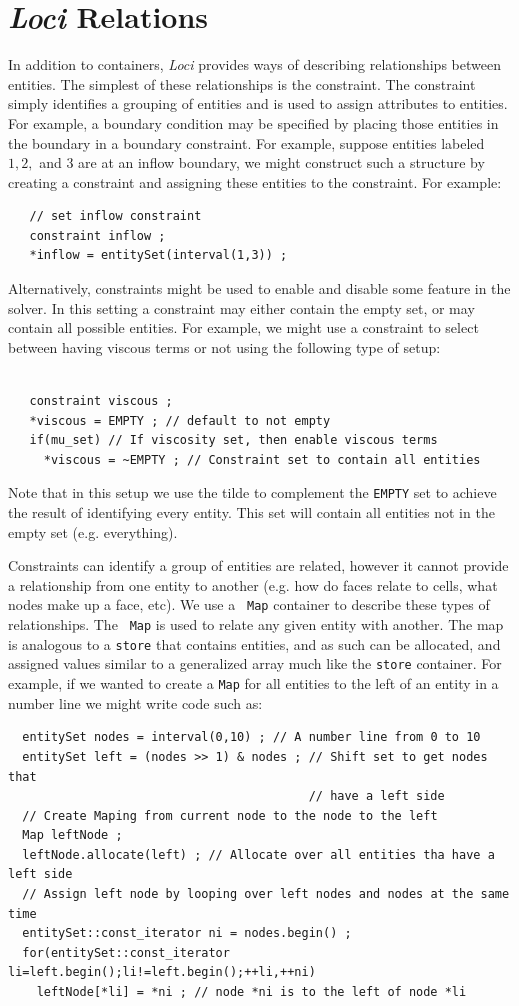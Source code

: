 \documentclass[10pt,epsf,letterpaper,twoside]{book}
\begin{document}
\section{{\it Loci} Relations}

In addition to containers, {\it Loci} provides ways of describing
relationships between entities.  The simplest of these relationships
is the constraint.  The constraint simply identifies a grouping of
entities and is used to assign attributes to entities.  For example, a
boundary condition may be specified by placing those entities in the
boundary in a boundary constraint.  For example, suppose entities
labeled $1,2,$ and $3$ are at an inflow boundary, we might construct
such a structure by creating a constraint and assigning these entities
to the constraint.  For example:
\begin{verbatim}
   // set inflow constraint
   constraint inflow ;
   *inflow = entitySet(interval(1,3)) ;
\end{verbatim}
Alternatively, constraints might be used to enable and disable some
feature in the solver.  In this setting a constraint may either
contain the empty set, or may contain all possible entities.  For
example, we might use a constraint to select between having viscous
terms or not using the following type of setup:
\begin{verbatim}

   constraint viscous ;
   *viscous = EMPTY ; // default to not empty 
   if(mu_set) // If viscosity set, then enable viscous terms
     *viscous = ~EMPTY ; // Constraint set to contain all entities
\end{verbatim}
Note that in this setup we use the tilde to complement the {\tt EMPTY} set
to achieve the result of identifying every entity.  This set will contain
all entities not in the empty set (e.g. everything).  

Constraints can identify a group of entities are related, however it
cannot provide a relationship from one entity to another (e.g. how do
faces relate to cells, what nodes make up a face, etc).  We use a {\tt
  Map} container to describe these types of relationships.  The {\tt
  Map} is used to relate any given entity with another.  The map is
analogous to a {\tt store} that contains entities, and as such can be
allocated, and assigned values similar to a generalized array much
like the {\tt store} container.  For example, if we wanted to create a {\tt Map} for all entities to the left of an entity in a number line we might write code such as:
\begin{verbatim}
  entitySet nodes = interval(0,10) ; // A number line from 0 to 10
  entitySet left = (nodes >> 1) & nodes ; // Shift set to get nodes that
                                          // have a left side
  // Create Maping from current node to the node to the left
  Map leftNode ;
  leftNode.allocate(left) ; // Allocate over all entities tha have a left side
  // Assign left node by looping over left nodes and nodes at the same time
  entitySet::const_iterator ni = nodes.begin() ;
  for(entitySet::const_iterator li=left.begin();li!=left.begin();++li,++ni)
    leftNode[*li] = *ni ; // node *ni is to the left of node *li
\end{verbatim}
\end{document}

